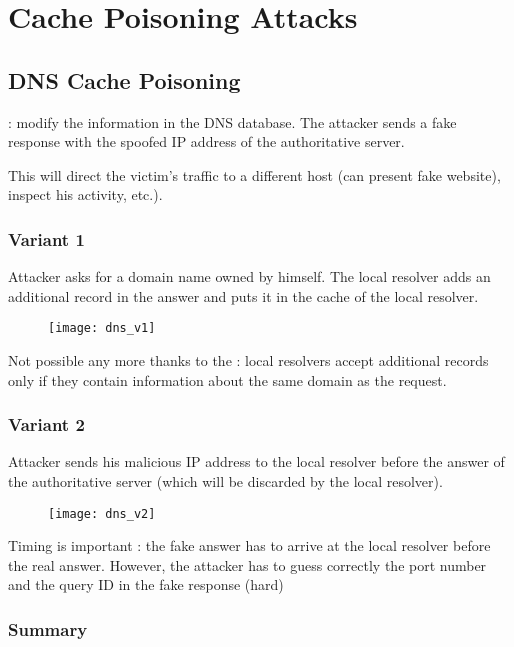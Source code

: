 \chapter{Cache Poisoning Attacks}

\section{DNS Cache Poisoning}

 : modify the information in the DNS database. The attacker sends a fake response with the spoofed IP address of the authoritative server.

This will direct the victim's traffic to a different host (can present fake website), inspect his activity, etc.).

\subsection{Variant 1}

Attacker asks for a domain name owned by himself. The local resolver adds an additional record in the answer and puts it in the cache of the local resolver.

\begin{figure}[H]
    \centering
    \texttt{[image: dns\_v1]}
\end{figure}

Not possible any more thanks to the  : local resolvers accept additional records only if they contain information about the same domain as the request.

\subsection{Variant 2}

Attacker sends his malicious IP address to the local resolver before the answer of the authoritative server (which will be discarded by the local resolver).

\begin{figure}[H]
    \centering
    \texttt{[image: dns\_v2]}
\end{figure}

Timing is important : the fake answer has to arrive at the local resolver before the real answer. However, the attacker has to guess correctly the port number and the query ID in the fake response (hard)

\subsection{Summary}

